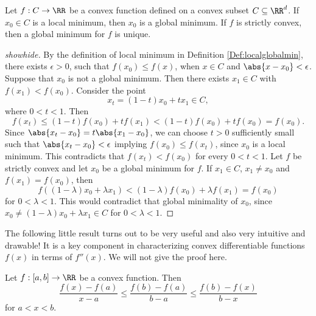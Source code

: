 \documentclass{article}
\begin{document}
\begin{theorem}[emph]\label{Thm:convexoptnice}
  Let $f: C\rightarrow \RR$ be a convex function defined on a convex subset $C\subseteq \RR^d$. If $x_0\in C$ is a
  local minimum, then $x_0$ is a global minimum. If $f$ is strictly
  convex, then a global minimum for $f$ is unique.
\end{theorem}
\begin{proof}[showhide]
 By the definition of local minimum in Definition \ref{Def:localglobalmin}, there exists $\epsilon > 0$, such that $f(x_0)\leq
  f(x)$, when $x \in C$ and $\abs{ x - x_0 }< \epsilon$. Suppose that
  $x_0$ is not a global minimum. Then there exists $x_1\in C$ with
  $f(x_1) < f(x_0)$. Consider the point
  \begin{equation*}
    x_t = (1 - t) x_0 + t x_1\in C,
  \end{equation*}
  where $0 < t < 1$. Then
  \begin{equation*}
    f(x_t) \leq (1-t) f(x_0) + t f(x_1) < (1-t) f(x_0) + t f(x_0) =
    f(x_0).
  \end{equation*}
  Since $\abs{ x_t - x_0 } = t \abs{ x_1 - x_0 }$, we can choose $t >
  0$ sufficiently small such that $\abs{ x_t - x_0 } < \epsilon$
  implying $f(x_0)\leq f(x_t)$, since $x_0$ is a local minimum. This
  contradicts that $f(x_t) < f(x_0)$ for every $0 < t < 1$.  Let $f$
  be strictly convex and let $x_0$ be a global minimum for $f$. If
  $x_1\in C$, $x_1\neq x_0$ and $f(x_1) = f(x_0)$, then
  \begin{equation*}
    f((1-\lambda) x_0 + \lambda x_1) < (1-\lambda) f(x_0) + \lambda f(x_1)
    = f(x_0)
  \end{equation*}
  for $0 < \lambda < 1$. This would contradict that global minimality
  of $x_0$, since $x_0\neq (1-\lambda)x_0 + \lambda x_1\in C$ for $0<
  \lambda < 1$.
\end{proof}


The following little result turns out to be very useful and
also very intuitive and drawable! It is a key component
in characterizing convex differentiable
functions $f(x)$ in terms of $f''(x)$. We will not give the proof here.

\begin{lemma}[emph]\label{littleconvresult}
  Let $f:[a,b]\rightarrow \RR$ be a convex function. Then
  \begin{equation*}
    \frac{f(x) - f(a)}{x - a} \leq
    \frac{f(b)-f(a)}{b - a} \leq \frac{f(b)-f(x)}{b - x}
  \end{equation*}
  for $a < x < b$.
\end{lemma}
\end{document}
